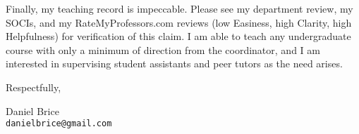 \documentclass[11pt]{article}
\begin{document}
Finally, my teaching record is impeccable. Please see my department
review, my SOCIs, and my RateMyProfessors.com reviews (low Easiness,
high Clarity, high Helpfulness) for verification of this claim. I am
able to teach any undergraduate course with only a minimum of direction
from the coordinator, and I am interested in supervising student
assistants and peer tutors as the need arises.

\vfill

Respectfully,

\vfill

Daniel Brice\\
\texttt{danielbrice@gmail.com}

\label{page:last}
\end{document}
